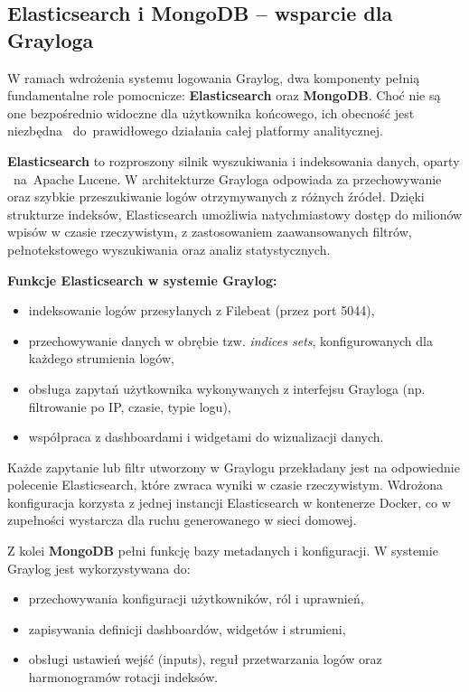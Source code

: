 \documentclass[
    left=2.5cm,         %
    right=2.5cm,        %
    top=2.5cm,          %
    bottom=3cm,         %
    bindingoffset=6mm,  %
    nohyphenation=true %
]{eiti/eiti-thesis} %
\begin{document}
\subsection{Elasticsearch i MongoDB – wsparcie dla Grayloga}

W ramach wdrożenia systemu logowania Graylog, dwa komponenty pełnią fundamentalne role pomocnicze: \textbf{Elasticsearch} oraz \textbf{MongoDB}\cite{mongodb}. 
Choć nie są one bezpośrednio widoczne dla użytkownika końcowego, ich obecność jest niezbędna ~do~prawidłowego działania całej platformy analitycznej.

\textbf{Elasticsearch} to rozproszony silnik wyszukiwania i indeksowania danych, oparty ~na~Apache Lucene\cite{lucene}. W architekturze Grayloga odpowiada 
za przechowywanie oraz szybkie przeszukiwanie logów otrzymywanych z różnych źródeł. Dzięki strukturze indeksów, Elasticsearch umożliwia natychmiastowy dostęp 
do milionów wpisów w czasie rzeczywistym, z zastosowaniem zaawansowanych filtrów, pełnotekstowego wyszukiwania oraz analiz statystycznych.

\textbf{Funkcje Elasticsearch w systemie Graylog:}
\begin{itemize}
    \item indeksowanie logów przesyłanych z Filebeat (przez port 5044),
    \item przechowywanie danych w obrębie tzw. \textit{indices sets}, konfigurowanych dla każdego strumienia logów,
    \item obsługa zapytań użytkownika wykonywanych z interfejsu Grayloga (np. filtrowanie po IP, czasie, typie logu),
    \item współpraca z dashboardami i widgetami do wizualizacji danych.
\end{itemize}

Każde zapytanie lub filtr utworzony w Graylogu przekładany jest na odpowiednie polecenie Elasticsearch, które zwraca wyniki w czasie rzeczywistym. Wdrożona konfiguracja korzysta z jednej instancji Elasticsearch w kontenerze Docker, co w zupełności wystarcza dla ruchu generowanego w sieci domowej.

Z kolei \textbf{MongoDB} pełni funkcję bazy metadanych i konfiguracji. W systemie Graylog jest wykorzystywana do:
\begin{itemize}
    \item przechowywania konfiguracji użytkowników, ról i uprawnień,
    \item zapisywania definicji dashboardów, widgetów i strumieni,
    \item obsługi ustawień wejść (inputs), reguł przetwarzania logów oraz harmonogramów rotacji indeksów.
\end{itemize}
\end{document}
